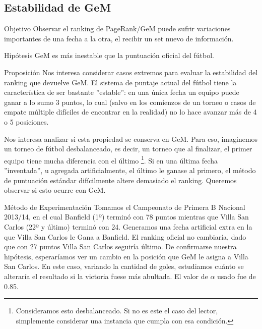\subsection{Estabilidad de GeM}
\label{subsec:exp7}
\begin{LaTeXdescription}
    \item[Objetivo] Observar el ranking de PageRank/GeM puede sufrir variaciones
        importantes de una fecha a la otra, el recibir un set nuevo de
        informaci\'on.\\

    \item[Hip\'otesis] GeM es m\'as inestable que la puntuaci\'on oficial del
        f\'utbol.\\

    \item[Proposici\'on] Nos interesa considerar casos extremos para evaluar la
        estabilidad del ranking que devuelve GeM. El sistema de puntaje actual
        del f\'utbol tiene la caracter\'istica de ser bastante ''estable'': en
        una \'unica fecha un equipo puede ganar a lo sumo 3 puntos, lo cual
        (salvo en los comienzos de un torneo o casos de empate m\'ultiple
        dif\'iciles de encontrar en la realidad) no lo hace avanzar m\'as de 4 o
        5 posiciones.

        \par Nos interesa analizar si esta propiedad se conserva en GeM. Para
        eso, imaginemos un torneo de f\'utbol desbalanceado, es decir, un torneo
        que al finalizar, el primer equipo tiene mucha diferencia con el
        \'ultimo \footnote{Consideramos esto desbalanceado. Si no es este el
        caso del lector, simplemente considerar una instancia que cumpla con esa
        condici\'on.}. Si en una \'ultima fecha ''inventada'', u agregada
        artificialmente, el \'ultimo le ganase al primero, el m\'etodo de
        puntuaci\'on est\'andar dif\'icilmente altere demasiado el ranking.
        Queremos observar si esto ocurre con GeM.\\

    \item[M\'etodo de Experimentaci\'on] Tomamos el Campeonato de Primera B
        Nacional 2013/14, en el cual Banfield (1º) termin\'o con 78 puntos
        mientras que Villa San Carlos (22º y \'ultimo) termin\'o con 24.
        Generamos una fecha artificial extra en la que Villa San Carlos le Gana
        a Banfield. El ranking oficial no cambiar\'ia, dado que con 27
        puntos Villa San Carlos seguir\'ia \'ultimo. De confirmarse nuestra
        hip\'otesis, esperar\'iamos ver un cambio en la posición que GeM le
        asigna a Villa San Carlos. En este caso, variando la cantidad de goles,
        estudiamos cu\'anto se alterar\'ia el resultado si la victoria fuese
        m\'as abultada. El valor de $\alpha$ usado fue de 0.85.\\


\end{LaTeXdescription}
